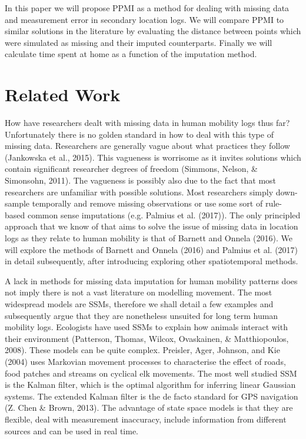 \documentclass[man]{apa6}
\theoremstyle{definition}
\theoremstyle{definition}
\theoremstyle{definition}
\theoremstyle{remark}
\begin{document}
In this paper we will propose PPMI as a method for dealing with missing
data and measurement error in secondary location logs. We will compare
PPMI to similar solutions in the literature by evaluating the distance
between points which were simulated as missing and their imputed
counterparts. Finally we will calculate time spent at home as a function
of the imputation method.

\section{Related Work}\label{related-work}

How have researchers dealt with missing data in human mobility logs thus
far? Unfortunately there is no golden standard in how to deal with this
type of missing data. Researchers are generally vague about what
practices they follow (Jankowska et al., 2015). This vagueness is
worrisome as it invites solutions which contain significant researcher
degrees of freedom (Simmons, Nelson, \& Simonsohn, 2011). The vagueness
is possibly also due to the fact that most researchers are unfamiliar
with possible solutions. Most researchers simply down-sample temporally
and remove missing observations or use some sort of rule-based common
sense imputations (e.g. Palmius et al. (2017)). The only principled
approach that we know of that aims to solve the issue of missing data in
location logs as they relate to human mobility is that of Barnett and
Onnela (2016). We will explore the methods of Barnett and Onnela (2016)
and Palmius et al. (2017) in detail subsequently, after introducing
exploring other spatiotemporal methods.

A lack in methods for missing data imputation for human mobility
patterns does not imply there is not a vast literature on modelling
movement. The most widespread models are SSMs, therefore we shall detail
a few examples and subsequently argue that they are nonetheless unsuited
for long term human mobility logs. Ecologists have used SSMs to explain
how animals interact with their environment (Patterson, Thomas, Wilcox,
Ovaskainen, \& Matthiopoulos, 2008). These models can be quite complex.
Preisler, Ager, Johnson, and Kie (2004) uses Markovian movement
processes to characterise the effect of roads, food patches and streams
on cyclical elk movements. The most well studied SSM is the Kalman
filter, which is the optimal algorithm for inferring linear Gaussian
systems. The extended Kalman filter is the de facto standard for GPS
navigation (Z. Chen \& Brown, 2013). The advantage of state space models
is that they are flexible, deal with measurement inaccuracy, include
information from different sources and can be used in real time.
\end{document}
